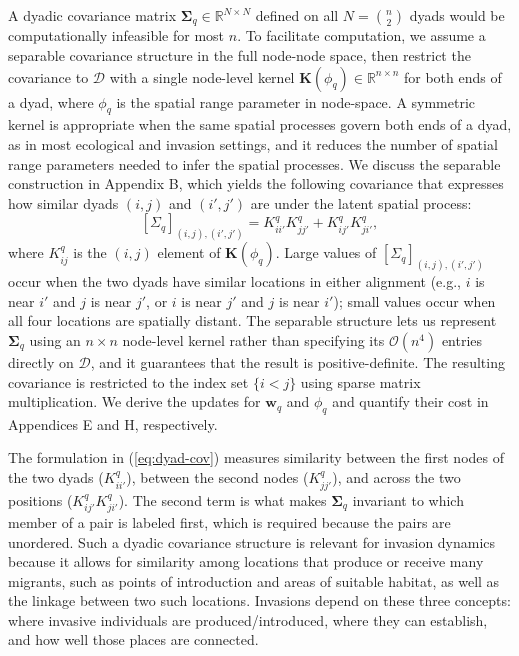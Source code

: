 \documentclass{article}
\begin{document}
A dyadic covariance matrix $\boldsymbol\Sigma_q\in\mathbb{R}^{N \times N}$ defined on all $N={n \choose 2}$ dyads would be computationally infeasible for most $n$.
To facilitate computation, we assume a separable covariance structure in the full node-node space, then restrict the covariance to $\mathcal{D}$ with a single node-level kernel $\mathbf{K}(\phi_q)\in\mathbb{R}^{n\times n}$ for both ends of a dyad, where $\phi_q$ is the spatial range parameter in node-space.
A symmetric kernel is appropriate when the same spatial processes govern both ends of a dyad, as in most ecological and invasion settings, and it reduces the number of spatial range parameters needed to infer the spatial processes. We discuss the separable construction in Appendix B, which yields the following covariance that expresses how similar dyads $(i,j)$ and $(i',j')$ are under the latent spatial process:
\begin{equation}\label{eq:dyad-cov}
    [\Sigma_q]_{(i,j),(i',j')}=K^q_{ii'}K_{jj'}^q+K^q_{ij'}K^q_{ji'},
\end{equation}
where $K^q_{ij}$ is the $(i,j)$ element of $\mathbf{K}(\phi_q)$. Large values of $[\Sigma_q]_{(i,j),(i',j')}$ occur when the two dyads have similar locations in either alignment (e.g., $i$ is near $i'$ and $j$ is near $j'$, or $i$ is near $j'$ and $j$ is near $i'$); small values occur when all four locations are spatially distant. 
The separable structure lets us represent $\boldsymbol{\Sigma}_q$ using an $n\times n$ node-level kernel rather than specifying its $\mathcal{O}(n^4)$ entries directly on $\mathcal{D}$, and it guarantees that the result is positive-definite. The resulting covariance is restricted to the index set $\{i<j\}$ using sparse matrix multiplication. 
We derive the updates for $\mathbf{w}_q$ and $\phi_q$ and quantify their cost in Appendices E and H, respectively.

The formulation in (\ref{eq:dyad-cov}) measures similarity between the first nodes of the two dyads ($K_{ii'}^q$), between the second nodes ($K_{jj'}^q$), and across the two positions ($K_{ij'}^qK_{ji'}^q$). 
The second term is what makes $\boldsymbol{\Sigma}_q$ invariant to which member of a pair is labeled first, which is required because the pairs are unordered.
Such a dyadic covariance structure is relevant for invasion dynamics because it allows for similarity among locations that produce or receive many migrants, such as points of introduction and areas of suitable habitat, as well as the linkage between two such locations. Invasions depend on these three concepts: where invasive individuals are produced/introduced, where they can establish, and how well those places are connected.
\end{document}
